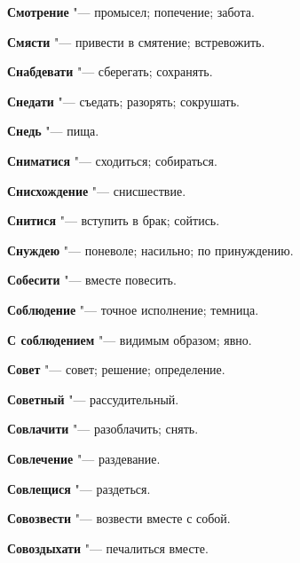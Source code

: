 \begin{mymulticols}{2}
\noindent\textbf{Смотрение} "--- промысел; попечение; забота. 




\noindent\textbf{Смясти} "--- привести в смятение; встревожить. 




\noindent\textbf{Снабдевати} "--- сберегать; сохранять. 




\noindent\textbf{Снедати} "--- съедать; разорять; сокрушать. 




\noindent\textbf{Снедь} "--- пища. 




\noindent\textbf{Сниматися} "--- сходиться; собираться. 




\noindent\textbf{Снисхождение} "--- снисшествие. 




\noindent\textbf{Снитися} "--- вступить в брак; сойтись. 




\noindent\textbf{Снуждею} "--- поневоле; насильно; по принуждению. 




\noindent\textbf{Собесити} "--- вместе повесить. 




\noindent\textbf{Соблюдение} "--- точное исполнение; темница. 




\noindent\textbf{С соблюдением} "--- видимым образом; явно. 




\noindent\textbf{Совет} "--- совет; решение; определение. 




\noindent\textbf{Советный} "--- рассудительный. 




\noindent\textbf{Совлачити} "--- разоблачить; снять. 




\noindent\textbf{Совлечение} "--- раздевание. 




\noindent\textbf{Совлещися} "--- раздеться. 




\noindent\textbf{Совозвести} "--- возвести вместе с собой. 




\noindent\textbf{Совоздыхати} "--- печалиться вместе. 





\end{mymulticols}
